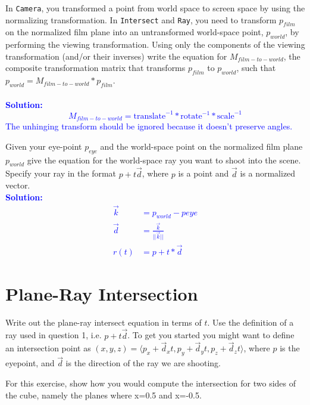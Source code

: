 \documentclass[10pt,twocolumn]{article}
\newcommand{\solution}[1]{\textcolor{Blue}{\\{\bf Solution:} \\ #1}}  %
\begin{document}
\begin{framed}
\noindent {\bf [1 point]} In {\tt Camera}, you transformed a point from world space to screen space by using the normalizing transformation. In {\tt Intersect} and {\tt Ray}, you need to transform $p_{film}$ on the normalized film plane into an untransformed world-space point, $p_{world}$, by performing the viewing transformation. Using only the components of the viewing transformation (and/or their inverses) write the equation for $M_{film-to-world}$, the composite transformation matrix that transforms $p_{film}$ to $p_{world}$, such that $p_{world} = M_{film-to-world} * p_{film}$.\\[5mm]
\solution{
\[M_{film-to-world} = \mbox{translate}^{-1} * \mbox{rotate}^{-1} * \mbox{scale}^{-1}\]
The unhinging transform should be ignored because it doesn't preserve angles.
} 
\end{framed}

\begin{framed}
\noindent {\bf [1 point]} Given your eye-point $p_{eye}$ and the world-space point on the normalized film plane $p_{world}$ give the equation for the world-space ray you want to shoot into the scene. Specify your ray in the format $p + t\vec{d}$, where $p$ is a point and $\vec{d}$ is a normalized vector. 
\solution{
\begin{align*}
\vec{k} &= p_{world} - p{eye}\\
\vec{d} &= \frac{\vec{k}}{||\vec{k}||} \\
r(t) &= p + t * \vec{d}
\end{align*}
}
\end{framed}

\section{Plane-Ray Intersection}

Write out the plane-ray intersect equation in terms of $t$. Use the definition of a ray used in question 1, i.e. $p + t\vec{d}$. To get you started you might want to define
an intersection point as $(x, y, z) = \langle p_x + \vec{d}_xt, p_y + \vec{d}_yt, p_z + \vec{d}_zt\rangle$, where $p$ is the eyepoint, and $\vec{d}$ is the direction of the ray we are shooting. 

For this exercise, show how you would compute the intersection for two sides of the cube, namely the planes where x=0.5 and x=-0.5.
\end{document}
